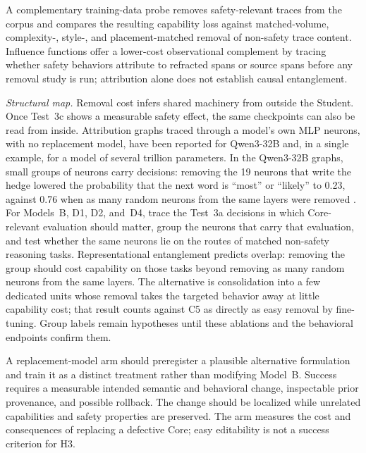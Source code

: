 \documentclass[11pt]{article}
\begin{document}
A complementary training-data probe removes safety-relevant traces from the
corpus and compares the resulting capability loss against matched-volume,
complexity-, style-, and placement-matched removal of non-safety trace content.
Influence functions \cite{grosse2023influence} offer a lower-cost observational
complement by tracing whether safety behaviors attribute to refracted spans or
source spans before any removal study is run; attribution alone does not
establish causal entanglement.

\emph{Structural map.} Removal cost infers shared machinery from outside the
Student. Once Test~3c shows a measurable safety effect, the same checkpoints
can also be read from inside. Attribution graphs traced through a model's own
MLP neurons, with no replacement model, have been reported for Qwen3-32B and, in a single example, for a model of several trillion parameters. In the Qwen3-32B graphs, small groups of neurons carry decisions: removing the 19 neurons that write
the hedge lowered the probability that the next word is ``most'' or ``likely'' to 0.23, against 0.76 when as
many random neurons from the same layers were removed
\cite{cammarata2026clean}. For Models~B, D1, D2, and~D4, trace the Test~3a
decisions in which Core-relevant evaluation should matter, group the neurons
that carry that evaluation, and test whether the same neurons lie on the routes
of matched non-safety reasoning tasks. Representational entanglement predicts
overlap: removing the group should cost capability on those tasks beyond
removing as many random neurons from the same layers. The alternative is
consolidation into a few dedicated units whose removal takes the targeted
behavior away at little capability cost; that result counts against C5 as
directly as easy removal by fine-tuning. Group labels remain hypotheses until
these ablations and the behavioral endpoints confirm them.

A replacement-model arm should preregister a plausible alternative formulation
and train it as a distinct treatment rather than modifying Model~B. Success
requires a measurable intended semantic and behavioral change, inspectable
prior provenance, and possible rollback. The change should be localized while
unrelated capabilities and safety properties are preserved. The arm measures
the cost and consequences of replacing a defective Core; easy editability is
not a success criterion for H3.
\end{document}
